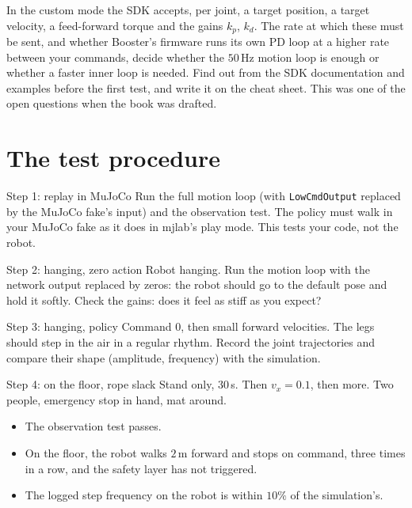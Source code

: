 \begin{guessbox}
In the custom mode the SDK accepts, per joint, a target position, a target velocity, a feed-forward torque and the gains $k_p$, $k_d$\guess. The rate at which these must be sent, and whether Booster's firmware runs its own PD loop at a higher rate between your commands, decide whether the $50$\,Hz motion loop is enough or whether a faster inner loop is needed. Find out from the SDK documentation and examples before the first test, and write it on the cheat sheet. This was one of the open questions when the book was drafted.
\end{guessbox}

\section*{The test procedure}
\begin{stepbox}{Step 1: replay in MuJoCo}
Run the full motion loop (with \texttt{LowCmdOutput} replaced by the MuJoCo fake's input) and the observation test. The policy must walk in your MuJoCo fake as it does in mjlab's play mode. This tests your code, not the robot.
\end{stepbox}
\begin{stepbox}{Step 2: hanging, zero action}
Robot hanging. Run the motion loop with the network output replaced by zeros: the robot should go to the default pose and hold it softly. Check the gains: does it feel as stiff as you expect?
\end{stepbox}
\begin{stepbox}{Step 3: hanging, policy}
Command $0$, then small forward velocities. The legs should step in the air in a regular rhythm. Record the joint trajectories and compare their shape (amplitude, frequency) with the simulation.
\end{stepbox}
\begin{stepbox}{Step 4: on the floor, rope slack}
Stand only, $30$\,s. Then $v_x=0.1$, then more. Two people, emergency stop in hand, mat around.
\end{stepbox}

\begin{checkbox}
\begin{itemize}[nosep]
  \item The observation test passes.
  \item On the floor, the robot walks $2$\,m forward and stops on command, three times in a row, and the safety layer has not triggered.
  \item The logged step frequency on the robot is within $10\%$ of the simulation's.
\end{itemize}
\end{checkbox}

